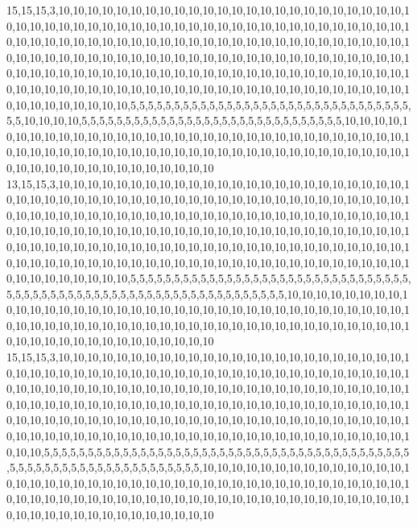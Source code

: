 15,15,15,3,10,10,10,10,10,10,10,10,10,10,10,10,10,10,10,10,10,10,10,10,10,10,10,10,10,10,10,10,10,10,10,10,10,10,10,10,10,10,10,10,10,10,10,10,10,10,10,10,10,10,10,10,10,10,10,10,10,10,10,10,10,10,10,10,10,10,10,10,10,10,10,10,10,10,10,10,10,10,10,10,10,10,10,10,10,10,10,10,10,10,10,10,10,10,10,10,10,10,10,10,10,10,10,10,10,10,10,10,10,10,10,10,10,10,10,10,10,10,10,10,10,10,10,10,10,10,10,10,10,10,10,10,10,10,10,10,10,10,10,10,10,10,10,10,10,10,10,10,10,10,10,10,10,10,10,10,10,10,10,10,10,10,10,10,10,10,10,10,10,10,10,10,10,5,5,5,5,5,5,5,5,5,5,5,5,5,5,5,5,5,5,5,5,5,5,5,5,5,5,5,5,5,5,5,5,5,5,10,10,10,10,5,5,5,5,5,5,5,5,5,5,5,5,5,5,5,5,5,5,5,5,5,5,5,5,5,5,5,5,5,5,10,10,10,10,10,10,10,10,10,10,10,10,10,10,10,10,10,10,10,10,10,10,10,10,10,10,10,10,10,10,10,10,10,10,10,10,10,10,10,10,10,10,10,10,10,10,10,10,10,10,10,10,10,10,10,10,10,10,10,10,10,10,10,10,10,10,10,10,10,10,10,10,10,10,10
13,15,15,3,10,10,10,10,10,10,10,10,10,10,10,10,10,10,10,10,10,10,10,10,10,10,10,10,10,10,10,10,10,10,10,10,10,10,10,10,10,10,10,10,10,10,10,10,10,10,10,10,10,10,10,10,10,10,10,10,10,10,10,10,10,10,10,10,10,10,10,10,10,10,10,10,10,10,10,10,10,10,10,10,10,10,10,10,10,10,10,10,10,10,10,10,10,10,10,10,10,10,10,10,10,10,10,10,10,10,10,10,10,10,10,10,10,10,10,10,10,10,10,10,10,10,10,10,10,10,10,10,10,10,10,10,10,10,10,10,10,10,10,10,10,10,10,10,10,10,10,10,10,10,10,10,10,10,10,10,10,10,10,10,10,10,10,10,10,10,10,10,10,10,10,10,10,5,5,5,5,5,5,5,5,5,5,5,5,5,5,5,5,5,5,5,5,5,5,5,5,5,5,5,5,5,5,5,5,5,5,5,5,5,5,5,5,5,5,5,5,5,5,5,5,5,5,5,5,5,5,5,5,5,5,5,5,5,5,5,5,10,10,10,10,10,10,10,10,10,10,10,10,10,10,10,10,10,10,10,10,10,10,10,10,10,10,10,10,10,10,10,10,10,10,10,10,10,10,10,10,10,10,10,10,10,10,10,10,10,10,10,10,10,10,10,10,10,10,10,10,10,10,10,10,10,10,10,10,10,10,10,10,10,10,10,10,10,10,10
15,15,15,3,10,10,10,10,10,10,10,10,10,10,10,10,10,10,10,10,10,10,10,10,10,10,10,10,10,10,10,10,10,10,10,10,10,10,10,10,10,10,10,10,10,10,10,10,10,10,10,10,10,10,10,10,10,10,10,10,10,10,10,10,10,10,10,10,10,10,10,10,10,10,10,10,10,10,10,10,10,10,10,10,10,10,10,10,10,10,10,10,10,10,10,10,10,10,10,10,10,10,10,10,10,10,10,10,10,10,10,10,10,10,10,10,10,10,10,10,10,10,10,10,10,10,10,10,10,10,10,10,10,10,10,10,10,10,10,10,10,10,10,10,10,10,10,10,10,10,10,10,10,10,10,10,10,10,10,10,10,10,10,10,10,10,10,10,10,10,10,5,5,5,5,5,5,5,5,5,5,5,5,5,5,5,5,5,5,5,5,5,5,5,5,5,5,5,5,5,5,5,5,5,5,5,5,5,5,5,5,5,5,5,5,5,5,5,5,5,5,5,5,5,5,5,5,5,5,5,5,5,5,5,5,10,10,10,10,10,10,10,10,10,10,10,10,10,10,10,10,10,10,10,10,10,10,10,10,10,10,10,10,10,10,10,10,10,10,10,10,10,10,10,10,10,10,10,10,10,10,10,10,10,10,10,10,10,10,10,10,10,10,10,10,10,10,10,10,10,10,10,10,10,10,10,10,10,10,10,10,10,10,10,10,10,10,10,10,10
